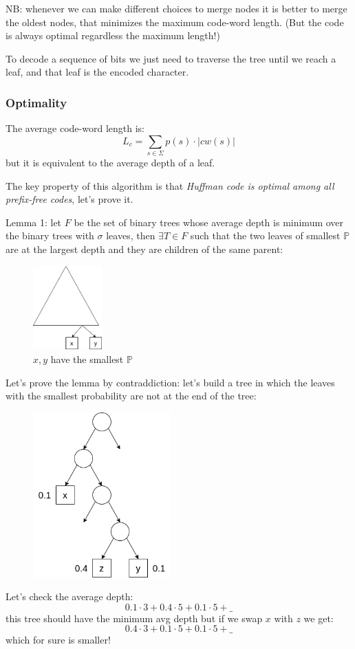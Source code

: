 NB: whenever we can make different choices to merge nodes it is better to merge the oldest nodes, that minimizes the maximum code-word length. (But the code is always optimal regardless the maximum length!)

To decode a sequence of bits we just need to traverse the tree until we reach a leaf, and that leaf is the encoded character.

\subsubsection{Optimality}
The average code-word length is:
$$
    L_c = \sum_{s \in \Sigma} p(s) \cdot |cw(s)|
$$
but it is equivalent to the average depth of a leaf.

The key property of this algorithm is that \emph{Huffman code is optimal among all prefix-free codes}, let's prove it.

Lemma 1: let $F$ be the set of binary trees whose average depth is minimum over the binary trees with $\sigma$ leaves, then $\exists T \in F$ such that the two leaves of smallest $\mathbb{P}$ are at the largest depth and they are children of the same parent:
\begin{figure}[H]
    \centering
    \includegraphics[width=100px]{images/10_Data_compression/huffman_proof_1.png}
    \caption{$x, y$ have the smallest $\mathbb{P}$}
\end{figure}
Let's prove the lemma by contraddiction: let's build a tree in which the leaves with the smallest probability are not at the end of the tree:
\begin{figure}[H]
    \centering
    \includegraphics[width=200px]{images/10_Data_compression/huffman_contraddiction.png}
\end{figure}
Let's check the average depth:
$$
    0.1 \cdot 3 + 0.4 \cdot 5 + 0.1 \cdot 5 + \_
$$
this tree should have the minimum avg depth but if we swap $x$ with $z$ we get:
$$
    0.4 \cdot 3 + 0.1 \cdot 5 + 0.1 \cdot 5 + \_
$$
which for sure is smaller!

